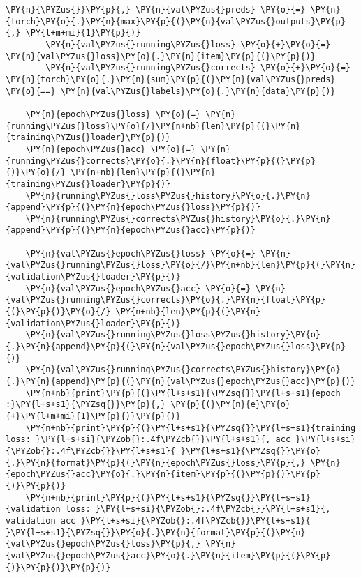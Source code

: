 \begin{tcolorbox}[breakable, size=fbox, boxrule=1pt, pad at break*=1mm,colback=cellbackground, colframe=cellborder]
\begin{Verbatim}[commandchars=\\\{\}]
        \PY{n}{\PYZus{}}\PY{p}{,} \PY{n}{val\PYZus{}preds} \PY{o}{=} \PY{n}{torch}\PY{o}{.}\PY{n}{max}\PY{p}{(}\PY{n}{val\PYZus{}outputs}\PY{p}{,} \PY{l+m+mi}{1}\PY{p}{)}
        \PY{n}{val\PYZus{}running\PYZus{}loss} \PY{o}{+}\PY{o}{=} \PY{n}{val\PYZus{}loss}\PY{o}{.}\PY{n}{item}\PY{p}{(}\PY{p}{)}
        \PY{n}{val\PYZus{}running\PYZus{}corrects} \PY{o}{+}\PY{o}{=} \PY{n}{torch}\PY{o}{.}\PY{n}{sum}\PY{p}{(}\PY{n}{val\PYZus{}preds} \PY{o}{==} \PY{n}{val\PYZus{}labels}\PY{o}{.}\PY{n}{data}\PY{p}{)}
      
    \PY{n}{epoch\PYZus{}loss} \PY{o}{=} \PY{n}{running\PYZus{}loss}\PY{o}{/}\PY{n+nb}{len}\PY{p}{(}\PY{n}{training\PYZus{}loader}\PY{p}{)}
    \PY{n}{epoch\PYZus{}acc} \PY{o}{=} \PY{n}{running\PYZus{}corrects}\PY{o}{.}\PY{n}{float}\PY{p}{(}\PY{p}{)}\PY{o}{/} \PY{n+nb}{len}\PY{p}{(}\PY{n}{training\PYZus{}loader}\PY{p}{)}
    \PY{n}{running\PYZus{}loss\PYZus{}history}\PY{o}{.}\PY{n}{append}\PY{p}{(}\PY{n}{epoch\PYZus{}loss}\PY{p}{)}
    \PY{n}{running\PYZus{}corrects\PYZus{}history}\PY{o}{.}\PY{n}{append}\PY{p}{(}\PY{n}{epoch\PYZus{}acc}\PY{p}{)}
    
    \PY{n}{val\PYZus{}epoch\PYZus{}loss} \PY{o}{=} \PY{n}{val\PYZus{}running\PYZus{}loss}\PY{o}{/}\PY{n+nb}{len}\PY{p}{(}\PY{n}{validation\PYZus{}loader}\PY{p}{)}
    \PY{n}{val\PYZus{}epoch\PYZus{}acc} \PY{o}{=} \PY{n}{val\PYZus{}running\PYZus{}corrects}\PY{o}{.}\PY{n}{float}\PY{p}{(}\PY{p}{)}\PY{o}{/} \PY{n+nb}{len}\PY{p}{(}\PY{n}{validation\PYZus{}loader}\PY{p}{)}
    \PY{n}{val\PYZus{}running\PYZus{}loss\PYZus{}history}\PY{o}{.}\PY{n}{append}\PY{p}{(}\PY{n}{val\PYZus{}epoch\PYZus{}loss}\PY{p}{)}
    \PY{n}{val\PYZus{}running\PYZus{}corrects\PYZus{}history}\PY{o}{.}\PY{n}{append}\PY{p}{(}\PY{n}{val\PYZus{}epoch\PYZus{}acc}\PY{p}{)}
    \PY{n+nb}{print}\PY{p}{(}\PY{l+s+s1}{\PYZsq{}}\PY{l+s+s1}{epoch :}\PY{l+s+s1}{\PYZsq{}}\PY{p}{,} \PY{p}{(}\PY{n}{e}\PY{o}{+}\PY{l+m+mi}{1}\PY{p}{)}\PY{p}{)}
    \PY{n+nb}{print}\PY{p}{(}\PY{l+s+s1}{\PYZsq{}}\PY{l+s+s1}{training loss: }\PY{l+s+si}{\PYZob{}:.4f\PYZcb{}}\PY{l+s+s1}{, acc }\PY{l+s+si}{\PYZob{}:.4f\PYZcb{}}\PY{l+s+s1}{ }\PY{l+s+s1}{\PYZsq{}}\PY{o}{.}\PY{n}{format}\PY{p}{(}\PY{n}{epoch\PYZus{}loss}\PY{p}{,} \PY{n}{epoch\PYZus{}acc}\PY{o}{.}\PY{n}{item}\PY{p}{(}\PY{p}{)}\PY{p}{)}\PY{p}{)}
    \PY{n+nb}{print}\PY{p}{(}\PY{l+s+s1}{\PYZsq{}}\PY{l+s+s1}{validation loss: }\PY{l+s+si}{\PYZob{}:.4f\PYZcb{}}\PY{l+s+s1}{, validation acc }\PY{l+s+si}{\PYZob{}:.4f\PYZcb{}}\PY{l+s+s1}{ }\PY{l+s+s1}{\PYZsq{}}\PY{o}{.}\PY{n}{format}\PY{p}{(}\PY{n}{val\PYZus{}epoch\PYZus{}loss}\PY{p}{,} \PY{n}{val\PYZus{}epoch\PYZus{}acc}\PY{o}{.}\PY{n}{item}\PY{p}{(}\PY{p}{)}\PY{p}{)}\PY{p}{)}
\end{Verbatim}
\end{tcolorbox}

